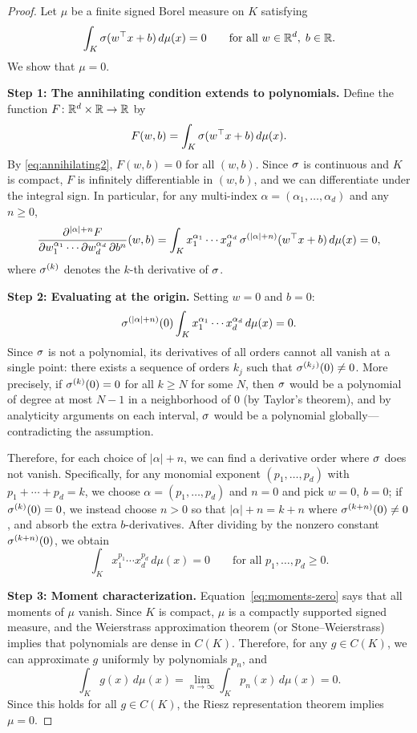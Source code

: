 \documentclass[11pt,a4paper]{article}
\begin{document}
\begin{proof}
Let $\mu$ be a finite signed Borel measure on $K$ satisfying
\begin{equation}
\label{eq:annihilating2}
  \int_K \sigma(w^\top x + b) \, d\mu(x) = 0
  \qquad \text{for all } w \in \mathbb{R}^d, \; b \in \mathbb{R}.
\end{equation}
We show that $\mu = 0$.

\textbf{Step 1: The annihilating condition extends to polynomials.}
Define the function $F \colon \mathbb{R}^d \times \mathbb{R} \to \mathbb{R}$ by
\[
  F(w, b) = \int_K \sigma(w^\top x + b) \, d\mu(x).
\]
By \eqref{eq:annihilating2}, $F(w, b) = 0$ for all $(w, b)$.  Since
$\sigma$ is continuous and $K$ is compact, $F$ is infinitely
differentiable in $(w, b)$, and we can differentiate under the integral sign.
In particular, for any multi-index $\alpha = (\alpha_1, \ldots, \alpha_d)$
and any $n \ge 0$,
\[
  \frac{\partial^{|\alpha|+n} F}{\partial w_1^{\alpha_1} \cdots
  \partial w_d^{\alpha_d} \, \partial b^n}(w, b)
  = \int_K x_1^{\alpha_1} \cdots x_d^{\alpha_d} \,
  \sigma^{(|\alpha|+n)}(w^\top x + b) \, d\mu(x) = 0,
\]
where $\sigma^{(k)}$ denotes the $k$-th derivative of $\sigma$.

\textbf{Step 2: Evaluating at the origin.}
Setting $w = 0$ and $b = 0$:
\[
  \sigma^{(|\alpha|+n)}(0)
  \int_K x_1^{\alpha_1} \cdots x_d^{\alpha_d} \, d\mu(x) = 0.
\]
Since $\sigma$ is not a polynomial, its derivatives of all orders cannot
all vanish at a single point: there exists a sequence of orders $k_j$ such
that $\sigma^{(k_j)}(0) \neq 0$.  More precisely, if
$\sigma^{(k)}(0) = 0$ for all $k \ge N$ for some $N$, then $\sigma$
would be a polynomial of degree at most $N-1$ in a neighborhood of $0$
(by Taylor's theorem), and by analyticity arguments on each interval,
$\sigma$ would be a polynomial globally---contradicting the assumption.

Therefore, for each choice of $|\alpha| + n$, we can find a derivative order
where $\sigma$ does not vanish.  Specifically, for any monomial exponent
$(p_1, \ldots, p_d)$ with $p_1 + \cdots + p_d = k$, we choose
$\alpha = (p_1, \ldots, p_d)$ and $n = 0$ and pick $w = 0$, $b = 0$;
if $\sigma^{(k)}(0) = 0$, we instead choose $n > 0$ so that
$|\alpha| + n = k + n$ where $\sigma^{(k+n)}(0) \neq 0$, and absorb the
extra $b$-derivatives.  After dividing by the nonzero constant
$\sigma^{(k+n)}(0)$, we obtain
\begin{equation}
\label{eq:moments-zero}
  \int_K x_1^{p_1} \cdots x_d^{p_d} \, d\mu(x) = 0
  \qquad \text{for all } p_1, \ldots, p_d \ge 0.
\end{equation}

\textbf{Step 3: Moment characterization.}
Equation~\eqref{eq:moments-zero} says that all moments of $\mu$ vanish.
Since $K$ is compact, $\mu$ is a compactly supported signed measure, and
the Weierstrass approximation theorem (or Stone--Weierstrass) implies that
polynomials are dense in $C(K)$.  Therefore, for any $g \in C(K)$, we
can approximate $g$ uniformly by polynomials $p_n$, and
\[
  \int_K g(x) \, d\mu(x) = \lim_{n \to \infty}
  \int_K p_n(x) \, d\mu(x) = 0.
\]
Since this holds for all $g \in C(K)$, the Riesz representation theorem
implies $\mu = 0$.
\end{proof}
\end{document}
